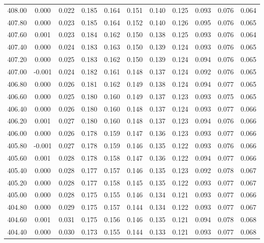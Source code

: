 \begin{longtable}{cccccccccc}
    408.00 &  0.000 &  0.022 &  0.185 &  0.164 &  0.151 &  0.140 &  0.125 &  0.093 &  0.076 &  0.064 \\
    407.80 &  0.000 &  0.023 &  0.185 &  0.164 &  0.152 &  0.140 &  0.126 &  0.095 &  0.076 &  0.065 \\
    407.60 &  0.001 &  0.023 &  0.184 &  0.162 &  0.150 &  0.138 &  0.125 &  0.093 &  0.076 &  0.064 \\
    407.40 &  0.000 &  0.024 &  0.183 &  0.163 &  0.150 &  0.139 &  0.124 &  0.093 &  0.076 &  0.065 \\
    407.20 &  0.000 &  0.025 &  0.183 &  0.162 &  0.150 &  0.139 &  0.124 &  0.094 &  0.076 &  0.065 \\
    407.00 & -0.001 &  0.024 &  0.182 &  0.161 &  0.148 &  0.137 &  0.124 &  0.092 &  0.076 &  0.065 \\
    406.80 &  0.000 &  0.026 &  0.181 &  0.162 &  0.149 &  0.138 &  0.124 &  0.094 &  0.077 &  0.065 \\
    406.60 &  0.000 &  0.025 &  0.180 &  0.160 &  0.149 &  0.137 &  0.123 &  0.093 &  0.075 &  0.065 \\
    406.40 &  0.000 &  0.026 &  0.180 &  0.160 &  0.148 &  0.137 &  0.124 &  0.093 &  0.077 &  0.066 \\
    406.20 &  0.001 &  0.027 &  0.180 &  0.160 &  0.148 &  0.137 &  0.123 &  0.094 &  0.076 &  0.066 \\
    406.00 &  0.000 &  0.026 &  0.178 &  0.159 &  0.147 &  0.136 &  0.123 &  0.093 &  0.077 &  0.066 \\
    405.80 & -0.001 &  0.027 &  0.178 &  0.159 &  0.146 &  0.135 &  0.122 &  0.093 &  0.076 &  0.066 \\
    405.60 &  0.001 &  0.028 &  0.178 &  0.158 &  0.147 &  0.136 &  0.122 &  0.094 &  0.077 &  0.066 \\
    405.40 &  0.000 &  0.028 &  0.177 &  0.157 &  0.146 &  0.135 &  0.123 &  0.092 &  0.078 &  0.067 \\
    405.20 &  0.000 &  0.028 &  0.177 &  0.158 &  0.145 &  0.135 &  0.122 &  0.093 &  0.077 &  0.067 \\
    405.00 &  0.000 &  0.028 &  0.175 &  0.155 &  0.146 &  0.134 &  0.121 &  0.093 &  0.077 &  0.066 \\
    404.80 &  0.000 &  0.029 &  0.175 &  0.157 &  0.144 &  0.134 &  0.122 &  0.093 &  0.077 &  0.067 \\
    404.60 &  0.001 &  0.031 &  0.175 &  0.156 &  0.146 &  0.135 &  0.121 &  0.094 &  0.078 &  0.068 \\
    404.40 &  0.000 &  0.030 &  0.173 &  0.155 &  0.144 &  0.133 &  0.121 &  0.093 &  0.077 &  0.068 \\

\end{longtable}
